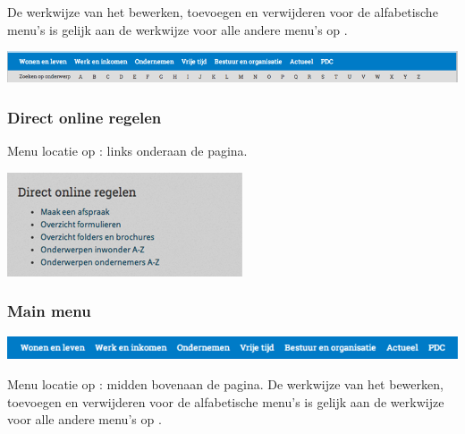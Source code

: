 De werkwijze van het bewerken, toevoegen en verwijderen voor de alfabetische menu's is gelijk aan de werkwijze voor alle andere menu's op \drupalpath{}.

\bigskip

\begin{center}
	\includegraphics[width=\textwidth]{img/menu3.png}
\end{center}


\subsubsection{Direct online regelen}\label{directonlineregelen}
Menu locatie op \drupalpath{}: links onderaan de pagina.
\bigskip

\begin{center}
	\includegraphics[width=\textwidth]{img/menu_directonline.png}
\end{center}

\bigskip

\subsubsection{Main menu}\label{mainmenu}

\begin{center}
	\includegraphics[width=\textwidth]{img/menu_main.png}
\end{center}

Menu locatie op \drupalpath{}: midden bovenaan de pagina. De werkwijze van het bewerken, toevoegen en verwijderen voor de alfabetische menu's is gelijk aan de werkwijze voor alle andere menu's op \drupalpath{}. 

